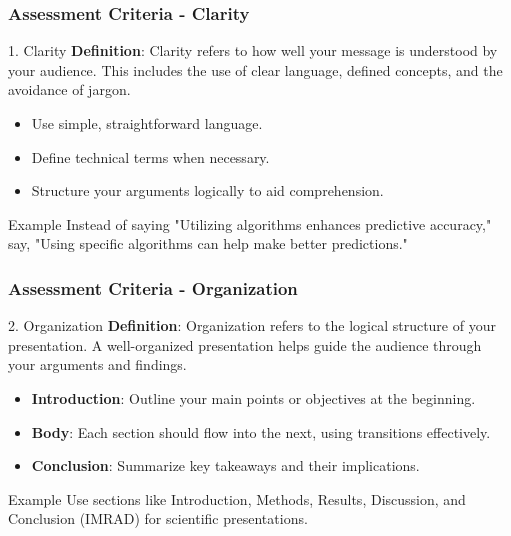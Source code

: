 \documentclass[aspectratio=169]{beamer}
\begin{document}
\begin{frame}[fragile]
    \frametitle{Assessment Criteria - Clarity}
    \begin{block}{1. Clarity}
        \textbf{Definition}: Clarity refers to how well your message is understood by your audience. 
        This includes the use of clear language, defined concepts, and the avoidance of jargon.
    \end{block}
    
    \begin{itemize}
        \item Use simple, straightforward language.
        \item Define technical terms when necessary.
        \item Structure your arguments logically to aid comprehension.
    \end{itemize}
    
    \begin{block}{Example}
        Instead of saying "Utilizing algorithms enhances predictive accuracy," say, "Using specific algorithms can help make better predictions."
    \end{block}
\end{frame}

\begin{frame}[fragile]
    \frametitle{Assessment Criteria - Organization}
    \begin{block}{2. Organization}
        \textbf{Definition}: Organization refers to the logical structure of your presentation. 
        A well-organized presentation helps guide the audience through your arguments and findings.
    \end{block}

    \begin{itemize}
        \item \textbf{Introduction}: Outline your main points or objectives at the beginning.
        \item \textbf{Body}: Each section should flow into the next, using transitions effectively.
        \item \textbf{Conclusion}: Summarize key takeaways and their implications.
    \end{itemize}

    \begin{block}{Example}
        Use sections like Introduction, Methods, Results, Discussion, and Conclusion (IMRAD) for scientific presentations.
    \end{block}
\end{frame}
\end{document}
